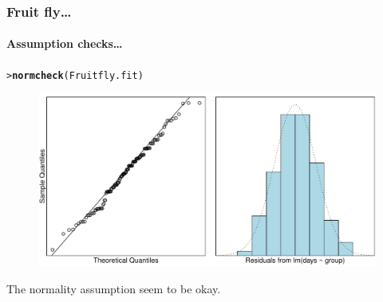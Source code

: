 \documentclass{beamer}\usepackage[]{graphicx}\usepackage[]{xcolor}
\makeatletter
\newcommand{\hlstd}[1]{\textcolor[rgb]{0.345,0.345,0.345}{#1}}%
\newcommand{\hlkwd}[1]{\textcolor[rgb]{0.737,0.353,0.396}{\textbf{#1}}}%
\newenvironment{kframe}{%
 \def\at@end@of@kframe{}%
 \ifinner\ifhmode%
  \def\at@end@of@kframe{\end{minipage}}%
  \begin{minipage}{\columnwidth}%
 \fi\fi%
 \def\FrameCommand##1{\hskip\@totalleftmargin \hskip-\fboxsep
 \colorbox{shadecolor}{##1}\hskip-\fboxsep
     \hskip-\linewidth \hskip-\@totalleftmargin \hskip\columnwidth}%
 \MakeFramed {\advance\hsize-\width
   \@totalleftmargin\z@ \linewidth\hsize
   \@setminipage}}%
 {\par\unskip\endMakeFramed%
 \at@end@of@kframe}
\newenvironment{knitrout}{}{} %
\makeatother
\begin{document}
\begin{frame}[fragile]
\frametitle{Fruit fly\ldots}
\framesubtitle{Assumption checks\ldots}

\begin{knitrout}\scriptsize
{}\color{fgcolor}\begin{kframe}
\begin{alltt}
\hlstd{> }\hlkwd{normcheck}\hlstd{(Fruitfly.fit)}
\end{alltt}
\end{kframe}
\end{knitrout}



\begin{figure}
  \centering
  \includegraphics[scale = 0.5]{figure/RC-H11-006}
\end{figure}

The normality assumption seem to be okay.
\end{frame}
\end{document}
